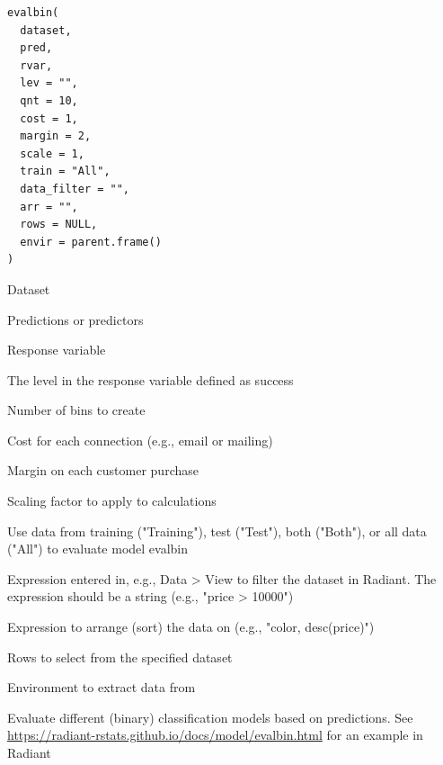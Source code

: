 \documentclass[a4paper]{book}
\begin{document}
%
\begin{Usage}
\begin{verbatim}
evalbin(
  dataset,
  pred,
  rvar,
  lev = "",
  qnt = 10,
  cost = 1,
  margin = 2,
  scale = 1,
  train = "All",
  data_filter = "",
  arr = "",
  rows = NULL,
  envir = parent.frame()
)
\end{verbatim}
\end{Usage}
%
\begin{Arguments}
\begin{ldescription}
\item[\code{dataset}] Dataset

\item[\code{pred}] Predictions or predictors

\item[\code{rvar}] Response variable

\item[\code{lev}] The level in the response variable defined as success

\item[\code{qnt}] Number of bins to create

\item[\code{cost}] Cost for each connection (e.g., email or mailing)

\item[\code{margin}] Margin on each customer purchase

\item[\code{scale}] Scaling factor to apply to calculations

\item[\code{train}] Use data from training ("Training"), test ("Test"), both ("Both"), or all data ("All") to evaluate model evalbin

\item[\code{data\_filter}] Expression entered in, e.g., Data > View to filter the dataset in Radiant. The expression should be a string (e.g., "price > 10000")

\item[\code{arr}] Expression to arrange (sort) the data on (e.g., "color, desc(price)")

\item[\code{rows}] Rows to select from the specified dataset

\item[\code{envir}] Environment to extract data from
\end{ldescription}
\end{Arguments}
%
\begin{Details}
Evaluate different (binary) classification models based on predictions. See \url{https://radiant-rstats.github.io/docs/model/evalbin.html} for an example in Radiant
\end{Details}
\end{document}
